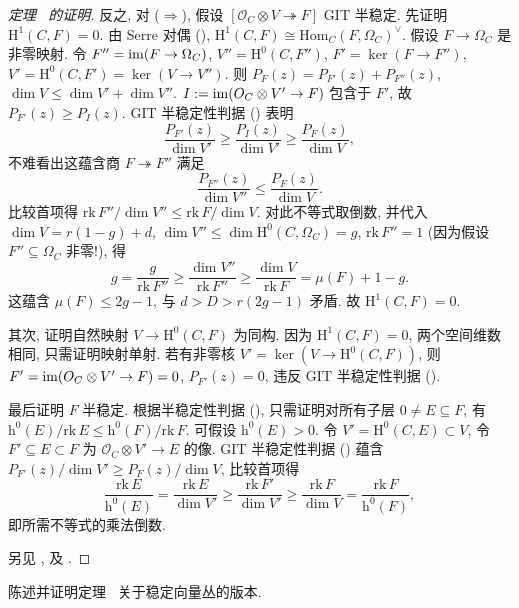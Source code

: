 \begin{proof}[定理~ 的证明]
反之, 对 ($\Rightarrow$), 假设 $[\mathcal O_C\otimes V\twoheadrightarrow F]$ GIT 半稳定. 先证明 $\mathrm H^1(C,F)=0$. 由 Serre 对偶 (), $\mathrm H^1(C,F)\cong\mathrm{Hom}_C(F,\Omega_C)^\vee$. 假设 $F\to\Omega_C$ 是非零映射. 令 $F''=\operatorname{im}(F\to\Omega_C)$, $V''=\mathrm H^0(C,F'')$, $F'=\ker(F\to F'')$, $V'=\mathrm H^0(C,F')=\ker(V\to V'')$. 则 $P_F(z)=P_{F'}(z)+P_{F''}(z)$, $\dim V\leq\dim V'+\dim V''$. $I:=\operatorname{im}(O_C\otimes V'\to F)$ 包含于 $F'$, 故 $P_{F'}(z)\geq P_I(z)$. GIT 半稳定性判据 () 表明
\[
\frac{P_{F'}(z)}{\dim V'}\geq\frac{P_I(z)}{\dim V'}\geq\frac{P_F(z)}{\dim V},
\]
不难看出这蕴含商 $F\twoheadrightarrow F''$ 满足
\begin{equation}\label{src:9.5.18}
\frac{P_{F''}(z)}{\dim V''}\leq\frac{P_F(z)}{\dim V}.
\end{equation}
比较首项得 $\mathrm{rk}\,F''/\dim V''\leq\mathrm{rk}\,F/\dim V$. 对此不等式取倒数, 并代入 $\dim V=r(1-g)+d$, $\dim V''\leq\dim\mathrm H^0(C,\Omega_C)=g$, $\mathrm{rk}\,F''=1$ (因为假设 $F''\subseteq\Omega_C$ 非零!), 得
\[
g=\frac{g}{\mathrm{rk}\,F''}\geq\frac{\dim V''}{\mathrm{rk}\,F''}\geq\frac{\dim V}{\mathrm{rk}\,F}=\mu(F)+1-g.
\]
这蕴含 $\mu(F)\leq2g-1$, 与 $d>D>r(2g-1)$ 矛盾. 故 $\mathrm H^1(C,F)=0$.

其次, 证明自然映射 $V\to\mathrm H^0(C,F)$ 为同构. 因为 $\mathrm H^1(C,F)=0$, 两个空间维数相同, 只需证明映射单射. 若有非零核 $V'=\ker(V\to\mathrm H^0(C,F))$, 则 $F'=\operatorname{im}(O_C\otimes V'\to F)=0$, $P_{F'}(z)=0$, 违反 GIT 半稳定性判据 ().

最后证明 $F$ 半稳定. 根据半稳定性判据 (), 只需证明对所有子层 $0\neq E\subseteq F$, 有 $\mathrm h^0(E)/\mathrm{rk}\,E\leq\mathrm h^0(F)/\mathrm{rk}\,F$. 可假设 $\mathrm h^0(E)>0$. 令 $V'=\mathrm H^0(C,E)\subset V$, 令 $F'\subseteq E\subset F$ 为 $\mathcal O_C\otimes V'\to E$ 的像. GIT 半稳定性判据 () 蕴含 $P_{F'}(z)/\dim V'\geq P_F(z)/\dim V$, 比较首项得
\[
\frac{\mathrm{rk}\,E}{\mathrm h^0(E)}=\frac{\mathrm{rk}\,E}{\dim V'}\geq\frac{\mathrm{rk}\,F'}{\dim V'}\geq\frac{\mathrm{rk}\,F}{\dim V}=\frac{\mathrm{rk}\,F}{\mathrm h^0(F)},
\]
即所需不等式的乘法倒数.

另见 \cite[定理 1.19]{Sim94a}, \cite[引理 7.2.4]{LP97} 及 \cite[定理 4.3.3]{HL10}.
\end{proof}
\begin{exercise}\label{src:9.5.19}
陈述并证明定理~ 关于稳定向量丛的版本.
\end{exercise}
